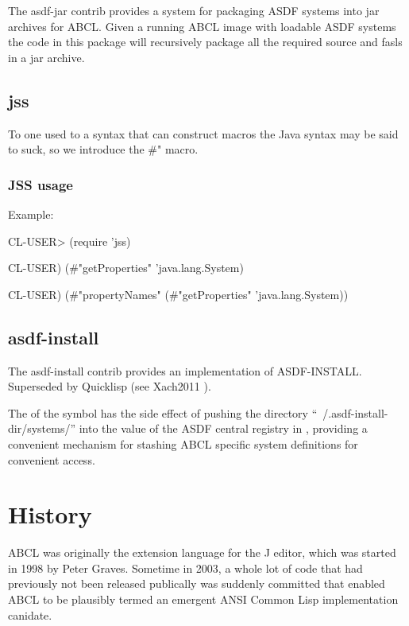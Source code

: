 \documentclass[10pt]{book}
\begin{document}
The asdf-jar contrib provides a system for packaging ASDF systems into
jar archives for ABCL.  Given a running ABCL image with loadable ASDF
systems the code in this package will recursively package all the
required source and fasls in a jar archive.

\section{jss}
\label{section:jss}

To one used to a syntax that can construct macros the Java syntax
may be said to suck, so we introduce the  \#" macro.

\subsection{JSS usage}

Example:

\begin{listing-lisp}
CL-USER> (require 'jss)

CL-USER) (#"getProperties" 'java.lang.System)

CL-USER) (#"propertyNames" (#"getProperties" 'java.lang.System))
\end{listing-lisp}

\section{asdf-install}

The asdf-install contrib provides an implementation of ASDF-INSTALL.
Superseded by Quicklisp (see Xach2011 \cite{Xach2011}).

The  of the  symbol has the side
effect of pushing the directory ``~/.asdf-install-dir/systems/'' into
the value of the \textsc{ASDF} central registry in
, providing a convenient mechanism for
stashing \textsc{ABCL} specific system definitions for convenient
access.

\chapter{History}

\textsc{ABCL} was originally the extension language for the J editor, which was
started in 1998 by Peter Graves.  Sometime in 2003, a whole lot of
code that had previously not been released publically was suddenly
committed that enabled ABCL to be plausibly termed an emergent ANSI
Common Lisp implementation canidate.
\end{document}
